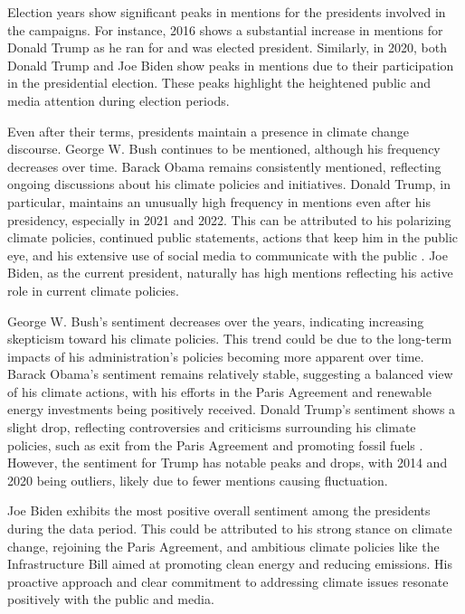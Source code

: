 Election years show significant peaks in mentions for the presidents involved in the campaigns. For instance, 2016 shows a substantial increase in mentions for Donald Trump as he ran for and was elected president. Similarly, in 2020, both Donald Trump and Joe Biden show peaks in mentions due to their participation in the presidential election. These peaks highlight the heightened public and media attention during election periods.

Even after their terms, presidents maintain a presence in climate change discourse. George W. Bush continues to be mentioned, although his frequency decreases over time. Barack Obama remains consistently mentioned, reflecting ongoing discussions about his climate policies and initiatives. Donald Trump, in particular, maintains an unusually high frequency in mentions even after his presidency, especially in 2021 and 2022. This can be attributed to his polarizing climate policies, continued public statements, actions that keep him in the public eye, and his extensive use of social media to communicate with the public \cite{trumptruthsocial}. Joe Biden, as the current president, naturally has high mentions reflecting his active role in current climate policies.

George W. Bush's sentiment decreases over the years, indicating increasing skepticism toward his climate policies. This trend could be due to the long-term impacts of his administration's policies becoming more apparent over time. Barack Obama's sentiment remains relatively stable, suggesting a balanced view of his climate actions, with his efforts in the Paris Agreement and renewable energy investments being positively received. Donald Trump's sentiment shows a slight drop, reflecting controversies and criticisms surrounding his climate policies, such as exit from the Paris Agreement and promoting fossil fuels \cite{state2020,columbiaclimate2024}. However, the sentiment for Trump has notable peaks and drops, with 2014 and 2020 being outliers, likely due to fewer mentions causing fluctuation.

Joe Biden exhibits the most positive overall sentiment among the presidents during the data period. This could be attributed to his strong stance on climate change, rejoining the Paris Agreement, and ambitious climate policies like the Infrastructure Bill aimed at promoting clean energy and reducing emissions. His proactive approach and clear commitment to addressing climate issues resonate positively with the public and media.

